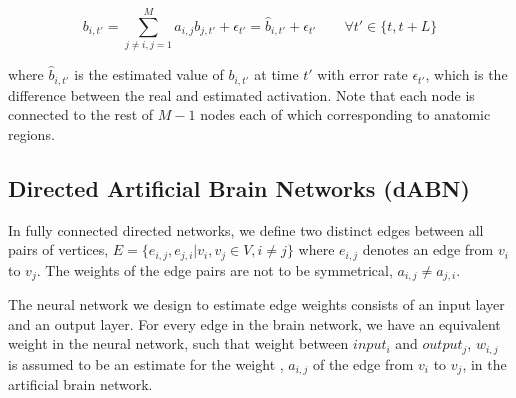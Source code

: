 \documentclass[runningheads]{llncs}
\begin{document}
\begin{equation}
b_{i,t'} = \sum_{j\neq i,j=1}^{M} a_{i,j} b_{j,t'} + \epsilon_{t'} = \hat{b}_{i,t'} + \epsilon_{t'}  \qquad \forall t' \in  \{t,t+L\}  
\label{eq:mesh_region_est}
\end{equation}


where $\hat{b}_{i,t'}$ is the estimated value of $b_{i,t'}$ at time $t'$ with error rate $\epsilon_{t'}$, which is the difference between the real and estimated activation. Note that  each node is connected to the rest of $M-1$  nodes each of which corresponding to anatomic regions.  







\subsection{Directed Artificial Brain Networks (dABN)}

In fully connected directed networks, we define two distinct edges between all pairs of vertices, $E = \{ e_{i,j}, e_{j,i}| v_i,v_j \in V, i \neq j \}$ where $e_{i,j}$ denotes an edge from $v_i$ to $v_j$. The weights of the edge pairs are not to be symmetrical, $a_{i,j} \neq a_{j,i}$.

The neural network we design to estimate edge weights consists of an input layer and an output layer. For every edge in the brain network, we have an equivalent weight in the neural network, such that weight between $input_{i}$ and $output_{j}$, $w_{i,j}$ is assumed to be an estimate for the weight , $a_{i,j}$ of the edge from $v_{i}$ to $v_{j}$, in the artificial brain network. 
\end{document}
